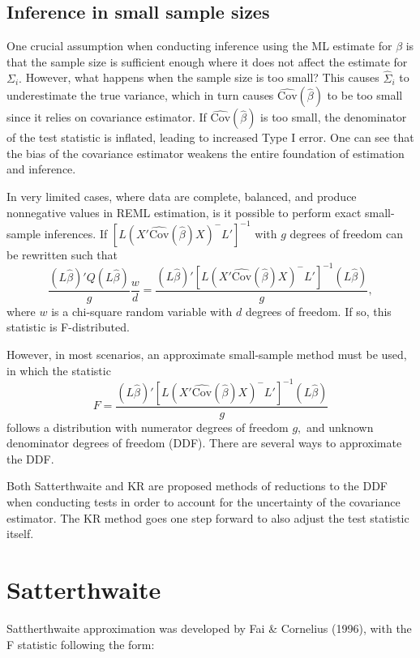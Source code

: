 \documentclass[12pt, twoside]{amherstthesis}
\begin{document}
\hypertarget{inference-in-small-sample-sizes}{%
\subsection{Inference in small sample sizes}\label{inference-in-small-sample-sizes}}

One crucial assumption when conducting inference using the ML estimate for \(\beta\) is that the sample size is sufficient enough where it does not affect the estimate for \(\Sigma_i.\) However, what happens when the sample size is too small? This causes \(\hat\Sigma_i\) to underestimate the true variance, which in turn causes \(\widehat {\text{Cov}}(\hat\beta)\) to be too small since it relies on covariance estimator. If \(\widehat {\text{Cov}}(\hat\beta)\) is too small, the denominator of the test statistic is inflated, leading to increased Type I error. One can see that the bias of the covariance estimator weakens the entire foundation of estimation and inference.

In very limited cases, where data are complete, balanced, and produce nonnegative values in REML estimation, is it possible to perform exact small-sample inferences. If \([L(X'\widehat {\text{Cov}}(\hat\beta)X)^-L']^{-1}\) with \(g\) degrees of freedom can be rewritten such that \[ \frac{(L\hat\beta)'Q(L\hat\beta)}{g}\frac{w}{d} =  \frac{(L\hat\beta)'[L(X'\widehat {\text{Cov}}(\hat\beta)X)^-L']^{-1}(L\hat\beta)}{g},\] where \(w\) is a chi-square random variable with \(d\) degrees of freedom. If so, this statistic is F-distributed.

However, in most scenarios, an approximate small-sample method must be used, in which the statistic \[F = \frac{(L\hat\beta)'[L(X'\widehat {\text{Cov}}(\hat\beta)X)^-L']^{-1}(L\hat\beta)}{g}\] follows a distribution with numerator degrees of freedom \(g,\) and unknown denominator degrees of freedom (DDF). There are several ways to approximate the DDF.

Both Satterthwaite and KR are proposed methods of reductions to the DDF when conducting tests in order to account for the uncertainty of the covariance estimator. The KR method goes one step forward to also adjust the test statistic itself.

\hypertarget{satterthwaite}{%
\section{Satterthwaite}\label{satterthwaite}}

Sattherthwaite approximation was developed by Fai \& Cornelius (1996), with the F statistic following the form:
\end{document}
